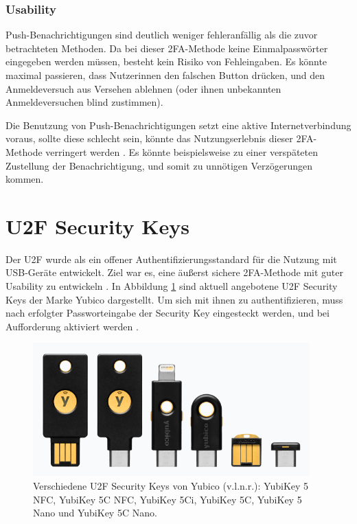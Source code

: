 \subsubsection{Usability}

Push-Benachrichtigungen sind deutlich weniger fehleranfällig als die zuvor betrachteten Methoden. Da bei dieser \ac{2FA}-Methode keine Einmalpasswörter eingegeben werden müssen, besteht kein Risiko von Fehleingaben. Es könnte maximal passieren, dass Nutzerinnen den falschen Button drücken, und den Anmeldeversuch aus Versehen ablehnen (oder ihnen unbekannten Anmeldeversuchen blind zustimmen).

Die Benutzung von Push-Benachrichtigungen setzt eine aktive Internetverbindung voraus, sollte diese schlecht sein, könnte das Nutzungserlebnis dieser \ac{2FA}-Methode verringert werden \parencite{reeseUsabilityStudy2019}. Es könnte beispielsweise zu einer verspäteten Zustellung der Benachrichtigung, und somit zu unnötigen Verzögerungen kommen.

\section{U2F Security Keys}
\label{sec:u2f}

Der \acf{U2F} wurde als ein offener Authentifizierungsstandard für die Nutzung mit USB-Geräte entwickelt. Ziel war es, eine äußerst sichere \ac{2FA}-Methode mit guter Usability zu entwickeln \parencite{langSecurityKeys2017}. In Abbildung \ref{fig:yubikey} sind aktuell angebotene \ac{U2F} Security Keys der Marke Yubico dargestellt. Um sich mit ihnen zu authentifizieren, muss nach erfolgter Passworteingabe der Security Key eingesteckt werden, und bei Aufforderung aktiviert werden \parencite{reeseUsabilityStudy2019}.

\begin{figure}
  \begin{center}
    \includegraphics[width=0.95\textwidth]{assets/yubikey-5.png}
  \end{center}
  \caption[Verschiedene U2F Security Keys von Yubico]{Verschiedene U2F Security Keys von Yubico (v.l.n.r.): YubiKey 5 NFC, YubiKey 5C NFC, YubiKey 5Ci, YubiKey 5C, YubiKey 5 Nano und YubiKey 5C Nano.\\\parencite{yubicoYubiKeySeries2024}}
  \label{fig:yubikey}
\end{figure}

